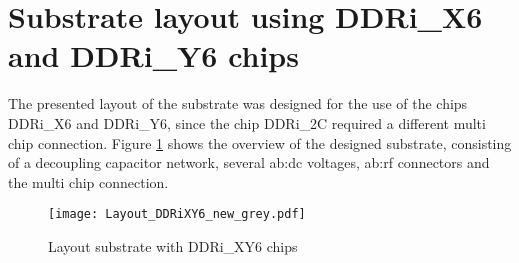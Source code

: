 \section{Substrate layout using DDRi\_X6 and DDRi\_Y6 chips}

The presented layout of the substrate was designed for the use of the chips DDRi\_X6 and DDRi\_Y6, since the chip DDRi\_2C required a different multi chip connection.
Figure \ref{fig:layoutDDRiXY6sub} shows the overview of the designed substrate, consisting of a decoupling capacitor network, several \gls{ab:dc} voltages, \gls{ab:rf} connectors and the multi chip connection.

\begin{figure}[htb!]
	\centering
  \texttt{[image: Layout\_DDRiXY6\_new\_grey.pdf]}
	\caption{Layout substrate with DDRi\_XY6 chips}
	\label{fig:layoutDDRiXY6sub}
\end{figure}


